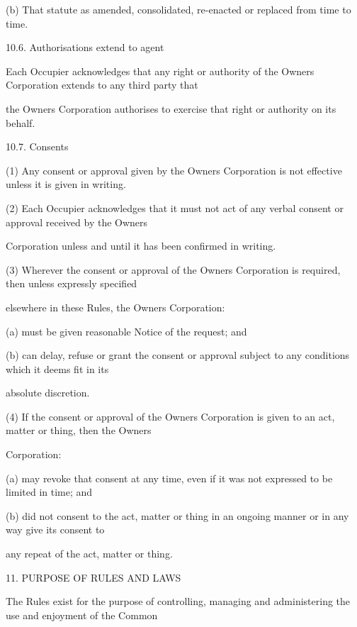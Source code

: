 \documentclass{article}
\begin{document}
{\fontsize{9.962}{1}(b) That statute as amended, consolidated, re-enacted or replaced from time to time. }

{\fontsize{9.99}{1}10.6. Authorisations extend to agent }

{\fontsize{10.02}{1}Each Occupier acknowledges that any right or authority of the Owners Corporation extends to any third party that }

{\fontsize{10.02}{1}the Owners Corporation authorises to exercise that right or authority on its behalf. }

\newpage

{\fontsize{9.99}{1}10.7. Consents }

{\fontsize{9.962}{1}(1) Any consent or approval given by the Owners Corporation is not effective unless it is given in writing. }

{\fontsize{9.962}{1}(2) Each Occupier acknowledges that it must not act of any verbal consent or approval received by the Owners }

{\fontsize{10.02}{1}Corporation unless and until it has been confirmed in writing. }

{\fontsize{9.962}{1}(3) Wherever the consent or approval of the Owners Corporation is required, then unless expressly specified }

{\fontsize{10.02}{1}elsewhere in these Rules, the Owners Corporation: }

{\fontsize{9.962}{1}(a) must be given reasonable Notice of the request; and }

{\fontsize{9.962}{1}(b) can delay, refuse or grant the consent or approval subject to any conditions which it deems fit in its }

{\fontsize{10.02}{1}absolute discretion. }

{\fontsize{9.962}{1}(4) If the consent or approval of the Owners Corporation is given to an act, matter or thing, then the Owners }

{\fontsize{10.02}{1}Corporation: }

{\fontsize{9.962}{1}(a) may revoke that consent at any time, even if it was not expressed to be limited in time; and }

{\fontsize{9.962}{1}(b) did not consent to the act, matter or thing in an ongoing manner or in any way give its consent to }

{\fontsize{10.02}{1}any repeat of the act, matter or thing. }

{\fontsize{9.99}{1}11. PURPOSE OF RULES AND LAWS }

{\fontsize{10.02}{1}The Rules exist for the purpose of controlling, managing and administering the use and enjoyment of the Common }
\end{document}
